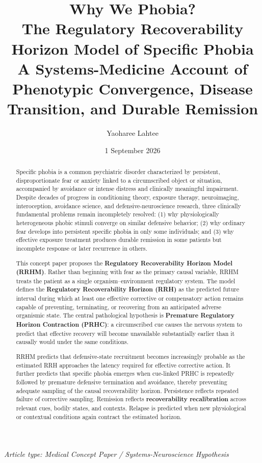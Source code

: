\documentclass[11pt]{article}
\title{\textbf{Why We Phobia?}\\[0.4em]
\large The Regulatory Recoverability Horizon Model of Specific Phobia\\[0.25em]
\normalsize A Systems-Medicine Account of Phenotypic Convergence, Disease Transition, and Durable Remission}
\author{Yaoharee Lahtee}
\date{1 September 2026}
\begin{document}
\maketitle

\begin{center}
\textit{Article type: Medical Concept Paper / Systems-Neuroscience Hypothesis}
\end{center}

\begin{abstract}
Specific phobia is a common psychiatric disorder characterized by persistent, disproportionate fear or anxiety linked to a circumscribed object or situation, accompanied by avoidance or intense distress and clinically meaningful impairment. Despite decades of progress in conditioning theory, exposure therapy, neuroimaging, interoception, avoidance science, and defensive-neuroscience research, three clinically fundamental problems remain incompletely resolved: (1) why physiologically heterogeneous phobic stimuli converge on similar defensive behavior; (2) why ordinary fear develops into persistent specific phobia in only some individuals; and (3) why effective exposure treatment produces durable remission in some patients but incomplete response or later recurrence in others.

This concept paper proposes the \textbf{Regulatory Recoverability Horizon Model (RRHM)}. Rather than beginning with fear as the primary causal variable, RRHM treats the patient as a single organism--environment regulatory system. The model defines the \textbf{Regulatory Recoverability Horizon (RRH)} as the predicted future interval during which at least one effective corrective or compensatory action remains capable of preventing, terminating, or recovering from an anticipated adverse organismic state. The central pathological hypothesis is \textbf{Premature Regulatory Horizon Contraction (PRHC)}: a circumscribed cue causes the nervous system to predict that effective recovery will become unavailable substantially earlier than it causally would under the same conditions.

RRHM predicts that defensive-state recruitment becomes increasingly probable as the estimated RRH approaches the latency required for effective corrective action. It further predicts that specific phobia emerges when cue-linked PRHC is repeatedly followed by premature defensive termination and avoidance, thereby preventing adequate sampling of the causal recoverability horizon. Persistence reflects repeated failure of corrective sampling. Remission reflects \textbf{recoverability recalibration} across relevant cues, bodily states, and contexts. Relapse is predicted when new physiological or contextual conditions again contract the estimated horizon.


\end{abstract}
\end{document}
